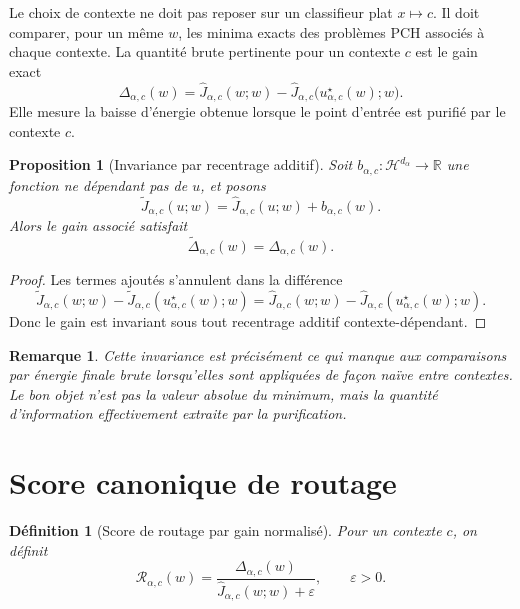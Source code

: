 \documentclass[11pt,a4paper]{article}
\newtheorem{definition}{Définition}[section]
\newtheorem{proposition}{Proposition}[section]
\newtheorem{remark}{Remarque}[section]
\newcommand{\R}{\mathbb R}
\newcommand{\Hh}{\mathcal H}
\begin{document}
Le choix de contexte ne doit pas reposer sur un classifieur plat $x\mapsto c$.
Il doit comparer, pour un même \(w\), les minima exacts des problèmes PCH associés à chaque contexte.
La quantité brute pertinente pour un contexte \(c\) est le gain exact
\begin{equation}\label{eq:gain-def}
\Delta_{\alpha,c}(w)
=
\widehat J_{\alpha,c}(w;w)
-
\widehat J_{\alpha,c}\bigl(u^\star_{\alpha,c}(w);w\bigr).
\end{equation}
Elle mesure la baisse d'énergie obtenue lorsque le point d'entrée est purifié par le contexte \(c\).

\begin{proposition}[Invariance par recentrage additif]
\label{prop:additive-invariance}
Soit \(b_{\alpha,c}:\Hh^{d_\alpha}\to \R\) une fonction ne dépendant pas de \(u\), et posons
\[
\widetilde J_{\alpha,c}(u;w)=\widehat J_{\alpha,c}(u;w)+b_{\alpha,c}(w).
\]
Alors le gain associé satisfait
\[
\widetilde\Delta_{\alpha,c}(w)=\Delta_{\alpha,c}(w).
\]
\end{proposition}

\begin{proof}
Les termes ajoutés s'annulent dans la différence
\[
\widetilde J_{\alpha,c}(w;w)-\widetilde J_{\alpha,c}(u^\star_{\alpha,c}(w);w)
=
\widehat J_{\alpha,c}(w;w)-\widehat J_{\alpha,c}(u^\star_{\alpha,c}(w);w).
\]
Donc le gain est invariant sous tout recentrage additif contexte-dépendant.
\end{proof}

\begin{remark}
Cette invariance est précisément ce qui manque aux comparaisons par énergie finale brute lorsqu'elles sont appliquées de façon naïve entre contextes.
Le bon objet n'est pas la valeur absolue du minimum, mais la quantité d'information effectivement extraite par la purification.
\end{remark}

\section{Score canonique de routage}

\begin{definition}[Score de routage par gain normalisé]
Pour un contexte \(c\), on définit
\begin{equation}\label{eq:routing-score}
\mathcal R_{\alpha,c}(w)
=
\frac{\Delta_{\alpha,c}(w)}{\widehat J_{\alpha,c}(w;w)+\varepsilon},
\qquad \varepsilon>0.
\end{equation}
\end{definition}
\end{document}

